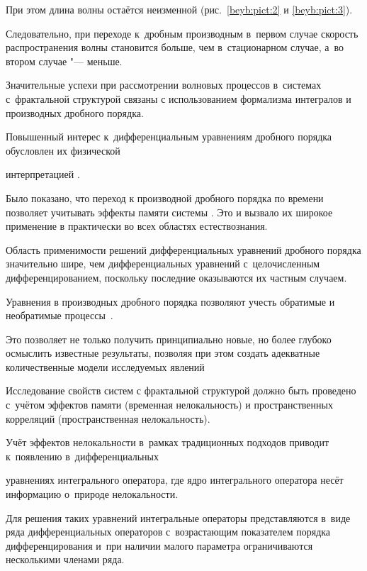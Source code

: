 При этом длина волны остаётся неизменной (рис.~\ref{beyb:pict:2} и \ref{beyb:pict:3}). 

Следовательно, при переходе к~дробным производным в~первом случае скорость распространения волны становится больше, чем в~стационарном случае, а~во втором случае "--- меньше.



\smallskip



 Значительные успехи при рассмотрении волновых процессов в~системах с~фрактальной структурой связаны с использованием формализма интегралов и производных дробного порядка. 

Повышенный интерес к~дифференциальным уравнениям дробного порядка обусловлен их физической

интерпретацией \cite{beyb:bib2,beyb:bib6}. 

Было показано, что переход к производной дробного порядка по времени позволяет учитывать эффекты памяти системы \cite{beyb:bib2}. Это и вызвало их широкое применение в практически во всех областях естествознания.



Область применимости решений дифференциальных уравнений дробного порядка значительно шире, чем дифференциальных уравнений с~целочисленным дифференцированием, поскольку последние оказываются их частным случаем.

Уравнения в производных дробного порядка позволяют учесть обратимые и необратимые процессы~\cite{beyb:bib2,beyb:bib6}. 

Это позволяет не только получить принципиально новые, но более глубоко осмыслить известные результаты, позволяя при этом создать адекватные количественные модели исследуемых явлений



Исследование свойств систем с фрактальной структурой должно быть проведено с~учётом эффектов памяти (временная нелокальность) и пространственных корреляций (пространственная нелокальность). 

Учёт эффектов не\-локальности в~рамках традиционных подходов приводит к~появлению в~дифференциальных

уравнениях интегрального оператора, где ядро интегрального оператора несёт информацию о~природе нелокальности. 

Для решения таких уравнений интегральные операторы представляются в~виде ряда дифференциальных операторов с~возрастающим показателем порядка дифференцирования и~при наличии малого параметра ограничиваются несколькими членами ряда. 

